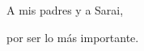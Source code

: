 \vspace*{0.2\textheight}

\noindent A mis padres y a Sarai, \bigbreak

\hfill por ser lo más importante.